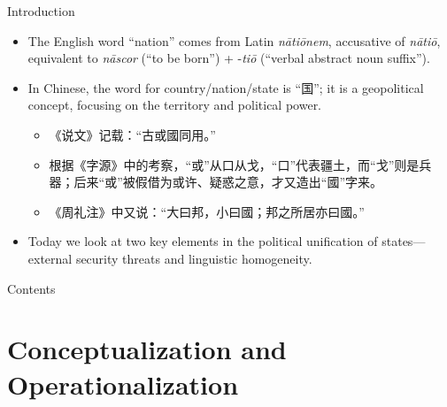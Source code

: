 \documentclass{beamer}
\begin{document}
	\begin{frame}{Introduction}
		\begin{itemize}
			\item The English word ``nation'' comes from Latin \textit{nātiōnem}, accusative of \textit{nātiō}, equivalent to \textit{nāscor} (``to be born'') +‎ -\textit{tiō} (``verbal abstract noun suffix'').
			\item In Chinese, the word for country/nation/state is ``国''; it is a geopolitical concept, focusing on the territory and political power.
			\begin{itemize}
				\item 《说文》记载：``古或國同用。''
				\item 根据《字源》中的考察，``或''从口从戈，``口''代表疆土，而``戈''则是兵器；后来``或''被假借为或许、疑惑之意，才又造出``國''字来。
				\item 《周礼注》中又说：``大曰邦，小曰國；邦之所居亦曰國。''
			\end{itemize}
			\item Today we look at two key elements in the political unification of states---external security threats and linguistic homogeneity.
		\end{itemize}
	\end{frame}


	\begin{frame}{Contents}
		\tableofcontents
	\end{frame}
	\section{Conceptualization and Operationalization}
\end{document}
